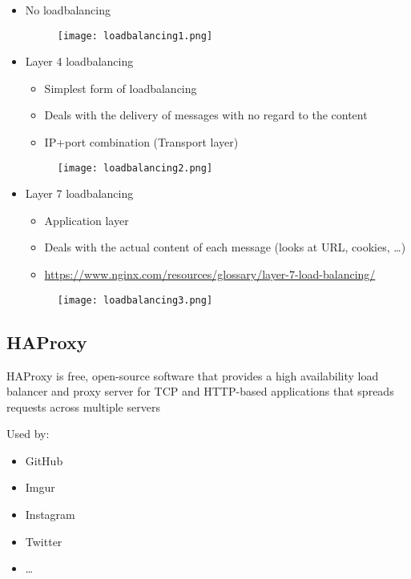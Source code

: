 \documentclass{article}
\begin{document}
\begin{itemize}
    \item No loadbalancing
    \begin{figure}[H]
        \centering
        \texttt{[image: loadbalancing1.png]}
    \end{figure}
    \item Layer 4 loadbalancing
    \begin{itemize}
        \item Simplest form of loadbalancing
        \item Deals with the delivery of messages with no regard to the content
        \item IP+port combination (Transport layer)
    \end{itemize}
    \begin{figure}[H]
        \centering
        \texttt{[image: loadbalancing2.png]}
    \end{figure}
    \item Layer 7 loadbalancing
    \begin{itemize}
        \item Application layer
        \item Deals with the actual content of each message (looks at URL, cookies, \dots)
        \item \url{https://www.nginx.com/resources/glossary/layer-7-load-balancing/}
    \end{itemize}
    \begin{figure}[H]
        \centering
        \texttt{[image: loadbalancing3.png]}
    \end{figure}
\end{itemize}


\subsection{HAProxy}

HAProxy is free, open-source software that provides a high availability load balancer
and proxy server for TCP and HTTP-based applications that spreads requests across multiple servers

Used by:

\begin{itemize}
    \item GitHub
    \item Imgur
    \item Instagram
    \item Twitter
    \item \dots
\end{itemize}
\end{document}
